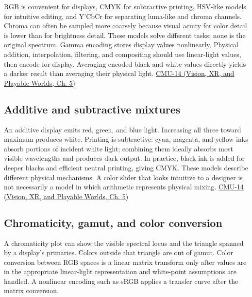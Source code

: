 RGB is convenient for displays, CMYK for subtractive printing, HSV-like models for intuitive editing, and Y'CbCr for separating luma-like and chroma channels. Chroma can often be sampled more coarsely because visual acuity for color detail is lower than for brightness detail. These models solve different tasks; none is the original spectrum. Gamma encoding stores display values nonlinearly. Physical addition, interpolation, filtering, and compositing should use linear-light values, then encode for display. Averaging encoded black and white values directly yields a darker result than averaging their physical light. \href{../07-Vision-XR-and-Playable-Worlds/main.pdf\#nameddest=04-visual-computing-ii-ch036-cmu-14---color}{CMU-14 (Vision, XR, and Playable Worlds, Ch. 5)}

\subsection{Additive and subtractive mixtures}\label{03-visual-computing-i-ch004-additive-and-subtractive-mixtures}

\hypertarget{03-visual-computing-i-ch004-additive-and-subtractive-mixtures}{}

An additive display emits red, green, and blue light. Increasing all three toward maximum produces white. Printing is subtractive: cyan, magenta, and yellow inks absorb portions of incident white light; combining them ideally absorbs most visible wavelengths and produces dark output. In practice, black ink is added for deeper blacks and efficient neutral printing, giving CMYK. These models describe different physical mechanisms. A color slider that looks intuitive to a designer is not necessarily a model in which arithmetic represents physical mixing. \href{../07-Vision-XR-and-Playable-Worlds/main.pdf\#nameddest=04-visual-computing-ii-ch036-cmu-14---color}{CMU-14 (Vision, XR, and Playable Worlds, Ch. 5)}

\subsection{Chromaticity, gamut, and color conversion}\label{03-visual-computing-i-ch004-chromaticity-gamut-and-color-conversion}

\hypertarget{03-visual-computing-i-ch004-chromaticity-gamut-and-color-conversion}{}

A chromaticity plot can show the visible spectral locus and the triangle spanned by a display's primaries. Colors outside that triangle are out of gamut. Color conversion between RGB spaces is a linear matrix transform only after values are in the appropriate linear-light representation and white-point assumptions are handled. A nonlinear encoding such as sRGB applies a transfer curve after the matrix conversion.

